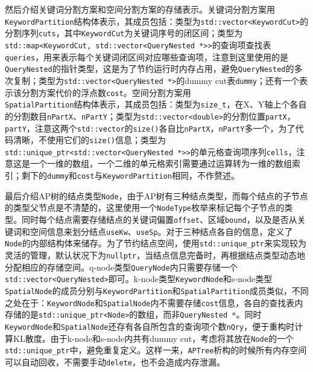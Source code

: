 \documentclass[UTF8]{ctexart}
\begin{document}
然后介绍关键词分割方案和空间分割方案的存储表示。关键词分割方案用\texttt{KeywordPartition}结构体表示，其成员包括：类型为\texttt{std::vector<KeywordCut>}的分割序列\texttt{cuts}，其中\texttt{KeywordCut}为关键词序号的闭区间；类型为\texttt{std::map<KeywordCut, std::vector<QueryNested *>>}的查询项查找表\texttt{queries}，用来表示每个关键词闭区间对应哪些查询项，注意到这里使用的是\texttt{QueryNested}的指针类型，这是为了节约运行时内存占用，避免\texttt{QueryNested}的多次复制；类型为\texttt{std::vector<QueryNested *>}的dummy cut表\texttt{dummy}；还有一个表示该分割方案代价的浮点数\texttt{cost}。空间分割方案用\\\texttt{SpatialPartition}结构体表示，其成员包括：类型为\texttt{size\_t}，在X、Y轴上个各自的分割数目\texttt{nPartX}、\texttt{nPartY}；类型为\texttt{std::vector<double>}的分割位置\texttt{partX}，\texttt{partY}，注意这两个\texttt{std::vector}的\texttt{size()}各自比\texttt{nPartX}，\texttt{nPartY}多一个，为了代码清晰，不使用它们的\texttt{size()}信息；类型为\\\texttt{std::unique\_ptr<std::vector<QueryNested *>>}的单元格查询项序列\texttt{cells}，注意这是一个一维的数组，一个二维的单元格索引需要通过运算转为一维的数组索引；剩下的\texttt{dummy}和\texttt{cost}与\texttt{KeywordPartition}相同，不作赘述。

最后介绍AP树的结点类型\texttt{Node}，由于AP树有三种结点类型，而每个结点的子节点的类型父节点是不清楚的，这里使用一个\texttt{NodeType}枚举来标记每个子节点的类型。同时每个结点需要存储结点的关键词偏置\texttt{offset}、区域\texttt{bound}，以及是否从关键词和空间信息来划分结点\texttt{useKw}、\texttt{useSp}。对于三种结点各自的信息，定义了\texttt{Node}的内部结构体来储存。为了节约结点空间，使用\texttt{std::unique\_ptr}来实现较为灵活的管理，默认状况下为\texttt{nullptr}，当结点信息完备时，再根据结点类型动态地分配相应的存储空间。q-node类型\texttt{QueryNode}内只需要存储一个\texttt{std::vector<QueryNested>}即可。k-node类型\texttt{KeywordNode}和s-node类型\texttt{SpatialNode}的成员分别与\texttt{KeywordPartition}和\texttt{SpatialPartition}成员类似，不同之处在于：\texttt{KeywordNode}和\texttt{SpatialNode}内不需要存储\texttt{cost}信息，各自的查找表内存储的是\texttt{std::unique\_ptr<Node>}的数组，而非\texttt{QueryNested *}。同时\texttt{KeywordNode}和\texttt{SpatialNode}还存有各自所包含的查询项个数\texttt{nQry}，便于重构时计算KL散度。由于k-node和s-node内共有dummy cut，考虑将其放在\texttt{Node}的一个\texttt{std::unique\_ptr}中，避免重复定义。这样一来，\texttt{APTree}析构的时候所有内存空间可以自动回收，不需要手动\texttt{delete}，也不会造成内存泄漏。
\end{document}
